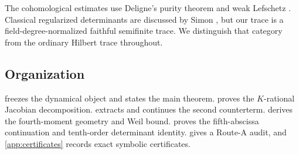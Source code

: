 The cohomological estimates use Deligne's purity theorem
\cite[Th\'eor\`eme~1.6]{Deligne1974} and weak Lefschetz
\cite[Expos\'e~XIV, Corollaire~4.6]{SGA2}.  Classical regularized
determinants are discussed by Simon \cite[Chapter~9]{Simon2005}, but our
trace is a field-degree-normalized faithful semifinite trace.  We distinguish
that category from the ordinary Hilbert trace throughout.

\subsection{Organization}

 freezes the dynamical object and states the main theorem.
 proves the \(K\)-rational Jacobian decomposition.
 extracts and continues the second counterterm.
 derives the fourth-moment geometry and Weil bound.
 proves the fifth-abscissa continuation and
tenth-order determinant identity.   gives a Route-A audit,
and \cref{app:certificates} records exact symbolic certificates.
